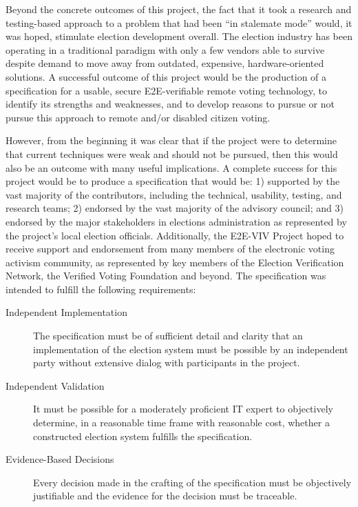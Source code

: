 Beyond the concrete outcomes of this project, the fact that it 
took a research and testing-based approach to a problem that
had been ``in stalemate mode'' would, it was hoped, stimulate election
development overall. The election industry has been operating in a
traditional paradigm with only a few vendors able to survive despite
demand to move away from outdated, expensive, hardware-oriented
solutions. A successful outcome of this project would be the production of a
specification for a usable, secure E2E-verifiable remote voting
technology, to identify its strengths and weaknesses, and to develop
reasons to pursue or not pursue this approach to remote and/or
disabled citizen voting. 

However, from the beginning it was clear that if the project were to
determine that current techniques were weak and should not be pursued,
then this would also be an outcome with many useful implications. A
complete success for this project would be to produce a specification
that would be: 1) supported by the vast majority of the contributors,
including the technical, usability, testing, and research teams; 2)
endorsed by the vast majority of the advisory council; and 3) endorsed
by the major stakeholders in elections administration as represented
by the project's local election officials. Additionally, the E2E-VIV
Project hoped to receive support and endorsement from many members of
the electronic voting activism community, as represented by key
members of the Election Verification Network, the Verified Voting
Foundation and beyond. The specification was intended to fulfill the
following requirements:

\begin{description}
\item[Independent Implementation] The specification must be of
  sufficient detail and clarity that an implementation of the election
  system must be possible by an independent party without extensive
  dialog with participants in the project.
\item[Independent Validation] It must be possible for a moderately
  proficient IT expert to objectively determine, in a reasonable time
  frame with reasonable cost, whether a constructed election system
  fulfills the specification.
\item[Evidence-Based Decisions] Every decision made in the crafting of
  the specification must be objectively justifiable and the evidence
  for the decision must be traceable.
\end{description}

